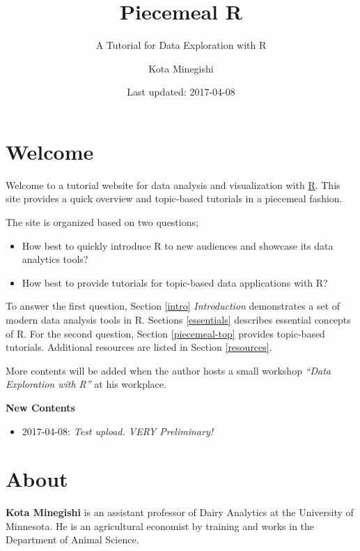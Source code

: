 \documentclass[]{book}
\title{Piecemeal R}
\subtitle{A Tutorial for Data Exploration with R}
\author{Kota Minegishi}
\date{Last updated: 2017-04-08}
\providecommand{\tightlist}{%
  \setlength{\itemsep}{0pt}\setlength{\parskip}{0pt}}
\theoremstyle{definition}
\theoremstyle{definition}
\theoremstyle{remark}
\begin{document}
\maketitle

{
\setcounter{tocdepth}{1}
\tableofcontents
}
\chapter*{Welcome}\label{welcome}

Welcome to a tutorial website for data analysis and visualization with
\href{https://www.r-project.org/}{R}. This site provides a quick
overview and topic-based tutorials in a piecemeal fashion.

The site is organized based on two questions;

\begin{itemize}
\item
  How best to quickly introduce R to new audiences and showcase its data
  analytics tools?
\item
  How best to provide tutorials for topic-based data applications with
  R?
\end{itemize}

To answer the first question, Section \ref{intro} \emph{Introduction}
demonstrates a set of modern data analysis tools in R. Sections
\ref{essentials} describes essential concepts of R. For the second
question, Section \ref{piecemeal-top} provides topic-based tutorials.
Additional resources are listed in Section \ref{resources}.

More contents will be added when the author hosts a small workshop
\emph{``Data Exploration with R''} at his workplace.

\textbf{New Contents}

\begin{itemize}
\tightlist
\item
  2017-04-08: {\emph{Test upload. VERY Preliminary!}}
\end{itemize}

\chapter*{About}\label{about}

\textbf{Kota Minegishi} is an assistant professor of Dairy Analytics at
the University of Minnesota. He is an agricultural economist by training
and works in the Department of Animal Science.
\end{document}
